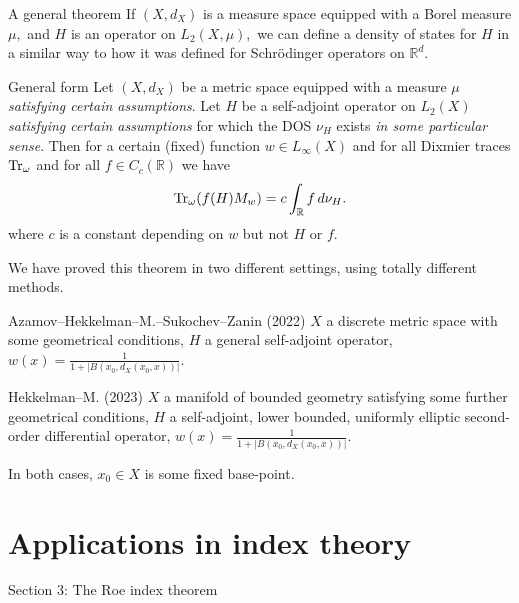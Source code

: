 \documentclass{beamer}
\numberwithin{equation}{section}
\theoremstyle{plain}
\theoremstyle{plain}
\theoremstyle{definition}
\theoremstyle{plain}
\theoremstyle{plain}
\theoremstyle{definition}
\newcommand{\tr}{{\rm Tr}}
\newcommand{\Rl}{\mathbb{R}}
\begin{document}
\begin{frame}{A general theorem}
    If $(X,d_X)$ is a measure space equipped with a Borel measure $\mu,$ and $H$ is an operator on $L_2(X,\mu),$ we can define a density of states for $H$ in a similar way to how it was defined for Schr\"odinger operators on $\Rl^d.$
        
    \begin{block}{General form}
    Let $(X, d_X)$ be a metric space equipped with a measure $\mu$ \emph{satisfying certain assumptions}. Let $H$ be a self-adjoint operator on $L_2(X)$ \emph{satisfying certain assumptions} for which the DOS $\nu_H$ exists \emph{in some particular sense}. Then for a certain (fixed) function $w\in L_\infty(X)$ and for all Dixmier traces $\tr_\omega$ and for all $f \in C_c(\mathbb{R})$ we have
    \begin{equation*}\label{F: DOS integral}
        \tr_\omega(f(H)M_w) = c\int_{\mathbb{R}} f\,d\nu_H.
    \end{equation*}
    where $c$ is a constant depending on $w$ but not $H$ or $f.$
    \end{block}
\end{frame}




\begin{frame}
We have proved this theorem in two different settings, using totally different methods.

\begin{block}{Azamov--Hekkelman--M.--Sukochev--Zanin (2022)}
$X$ a discrete metric space with some geometrical conditions, $H$ a general self-adjoint operator, $w(x) = \frac{1}{1+|B(x_0, d_X(x_0, x))|}$.
\end{block}

\begin{block}{Hekkelman--M. (2023)}
    $X$ a manifold of bounded geometry satisfying some further geometrical conditions, $H$ a self-adjoint, lower bounded, uniformly elliptic second-order differential operator, $w(x) = \frac{1}{1+|B(x_0, d_X(x_0, x))|}$.
\end{block}
In both cases, $x_0\in X$ is some fixed base-point.
\end{frame}

\section{Applications in index theory}

\begin{frame}
    \huge{Section 3: The Roe index theorem}
\end{frame}
\end{document}
